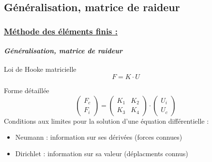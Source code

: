 \documentclass[10pt]{beamer}
\begin{document}
	\subsection{G\'en\'eralisation, matrice de raideur}
	\begin{frame}
		\frametitle{\uline{M\'ethode des \'el\'ements finis :}}
		\framesubtitle{\textit{G\'en\'eralisation, matrice de raideur}}
		\begin{block}{Loi de Hooke matricielle}
			\begin{equation}
  				F = K \cdot U
  			\end{equation}
		\end{block}
		\begin{block}{Forme d\'etaill\'ee}
			\begin{equation}
				\begin{pmatrix}
				F_c \\
				F_i
				\end{pmatrix}
				=
				\begin{pmatrix}
				K_1 & K_2 \\
				K_3 & K_4
				\end{pmatrix}
				\cdot
				\begin{pmatrix}
				U_i \\
				U_c
				\end{pmatrix}
			\end{equation}
			Conditions aux limites pour la solution d'une \'equation diff\'erentielle :
			\begin{itemize}
				\item Neumann : information sur ses dérivées (forces connues)
				\item Dirichlet : information sur sa valeur (déplacments connus)
			\end{itemize}
		\end{block}
	\end{frame}
\end{document}
